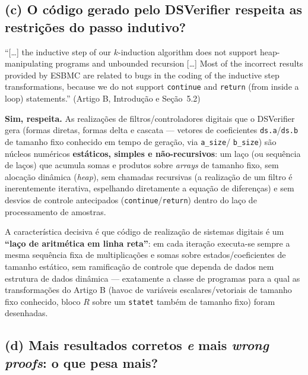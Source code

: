 \documentclass[12pt,a4paper]{article}
\newcommand{\vv}[1]{\texttt{#1}}
\begin{document}
\subsection{(c) O código gerado pelo DSVerifier respeita as restrições do passo indutivo?}

\begin{tcolorbox}[quotebox]
``[\ldots] the inductive step of our $k$-induction algorithm does not support heap-manipulating
programs and unbounded recursion [\ldots] Most of the incorrect results provided by ESBMC are
related to bugs in the coding of the inductive step transformations, because we do not support
\texttt{continue} and \texttt{return} (from inside a loop) statements.'' (Artigo B, Introdu\c{c}\~ao
e Se\c{c}\~ao~5.2)
\end{tcolorbox}

\begin{tcolorbox}[resultbox]
\textbf{Sim, respeita.} As realiza\c{c}\~oes de filtros/controladores digitais que o
DSVerifier gera (formas diretas, formas delta e cascata --- vetores de coeficientes
\vv{ds.a}/\vv{ds.b} de tamanho fixo conhecido em tempo de gera\c{c}\~ao, via \vv{a\_size}/
\vv{b\_size}) s\~ao n\'ucleos num\'ericos \textbf{est\'aticos, simples e n\~ao-recursivos}: um
la\c{c}o (ou sequ\^encia de la\c{c}os) que acumula somas e produtos sobre \emph{arrays} de
tamanho fixo, sem aloca\c{c}\~ao din\^amica (\emph{heap}), sem chamadas recursivas (a
realiza\c{c}\~ao de um filtro \'e inerentemente iterativa, espelhando diretamente a
equa\c{c}\~ao de diferen\c{c}as) e sem desvios de controle antecipados (\vv{continue}/\vv{return})
dentro do la\c{c}o de processamento de amostras.
\end{tcolorbox}

A caracter\'istica decisiva \'e que c\'odigo de realiza\c{c}\~ao de sistemas digitais \'e um
\textbf{``la\c{c}o de aritm\'etica em linha reta''}: em cada itera\c{c}\~ao executa-se sempre a
mesma sequ\^encia fixa de multiplica\c{c}\~oes e somas sobre estados/coeficientes de tamanho
est\'atico, sem ramifica\c{c}\~ao de controle que dependa de dados nem estrutura de dados
din\^amica --- exatamente a classe de programas para a qual as transforma\c{c}\~oes do
Artigo B (havoc de vari\'aveis escalares/vetoriais de tamanho fixo conhecido, bloco $R$ sobre
um \vv{statet} tamb\'em de tamanho fixo) foram desenhadas.

\subsection{(d) Mais resultados corretos \emph{e} mais \emph{wrong proofs}: o que pesa mais?}
\end{document}
